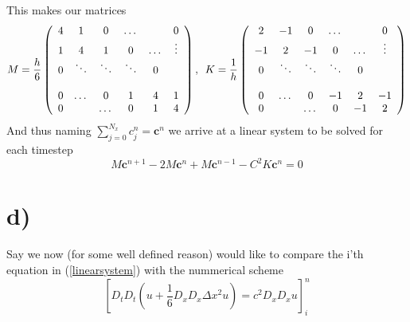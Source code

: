 \documentclass[a4paper,english, 10pt, twoside]{article}
\begin{document}
This makes our matrices
\begin{equation*}
 M = \frac{h}{6}\left(\begin{array}{c c c c c c}
    4 & 1 & 0 & \dots & & 0 \\
    1 & 4 & 1 & 0 &\dots & \vdots \\
    0 & \ddots & \ddots & \ddots & 0& \\
     & & & & & \\
     0 & \dots & 0 & 1 & 4 & 1\\
     0 & & \dots & 0 & 1 & 4
 \end{array}\right), \:\;
 K = \frac{1}{h}\left(\begin{array}{c c c c c c}
          2 & -1 & 0 & \dots & & 0 \\
	  -1 & 2 & -1 & 0 &\dots & \vdots \\
	  0 & \ddots & \ddots & \ddots & 0& \\
	  & & & & & \\
	  0 & \dots & 0 & -1 & 2 & -1\\
	  0 & & \dots & 0 & -1 & 2
                      \end{array}\right)
\end{equation*}
And thus naming $\sum\limits_{j=0}^{N_x}c^n_j = \mathbf{c}^n$ we arrive at a linear system to be solved for each timestep
\begin{equation}\label{linearsystem}
M\mathbf{c}^{n+1} -2M\mathbf{c}^{n} +M\mathbf{c}^{n-1} -C^2K\mathbf{c}^{n} = 0
\end{equation}

\section*{d)}
Say we now (for some well defined reason) would like to compare the i'th equation in (\ref{linearsystem}) with the nummerical 
scheme 
\begin{equation}\label{scheme}
\left[D_tD_t\left(u+\frac{1}{6}D_xD_x\Delta x^2u\right) = c^2D_xD_xu\right]^n_i
\end{equation}
\end{document}
